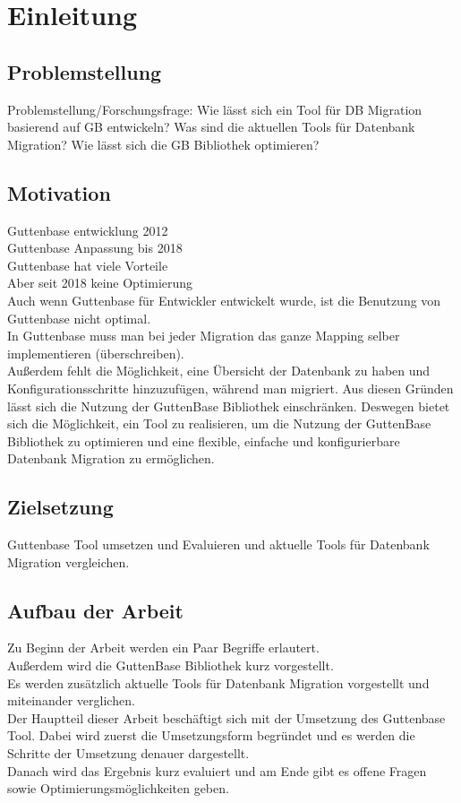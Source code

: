 \chapter{Einleitung}


\section{Problemstellung}

Problemstellung/Forschungsfrage: 
Wie lässt sich ein Tool für DB Migration basierend auf GB entwickeln?
Was sind die aktuellen Tools für Datenbank Migration?
Wie lässt sich die GB Bibliothek optimieren?


\section{Motivation}
Guttenbase entwicklung 2012 \\
Guttenbase Anpassung bis 2018\\
Guttenbase hat viele Vorteile\\
Aber seit 2018 keine Optimierung\\
Auch wenn Guttenbase für Entwickler entwickelt wurde, ist die Benutzung von Guttenbase nicht optimal.\\
In Guttenbase muss man bei jeder Migration das ganze Mapping selber implementieren (überschreiben). \\
Außerdem fehlt die Möglichkeit, eine Übersicht der Datenbank zu haben und Konfigurationsschritte hinzuzufügen, während man migriert.
Aus diesen Gründen lässt sich die Nutzung der GuttenBase Bibliothek einschränken. Deswegen bietet sich die Möglichkeit, ein Tool zu realisieren, um die Nutzung der GuttenBase Bibliothek zu optimieren und eine flexible, einfache und konfigurierbare Datenbank Migration zu ermöglichen.

\section{Zielsetzung}
Guttenbase Tool umsetzen und Evaluieren und aktuelle Tools für Datenbank Migration vergleichen.
\section{Aufbau der Arbeit}
Zu Beginn der Arbeit werden ein Paar Begriffe erlautert.\\
Außerdem wird die GuttenBase Bibliothek kurz vorgestellt.\\
Es werden zusätzlich aktuelle Tools für Datenbank Migration vorgestellt und miteinander verglichen.\\
Der Hauptteil dieser Arbeit beschäftigt sich mit der Umsetzung des Guttenbase Tool. Dabei wird zuerst die Umsetzungsform begründet und es werden die Schritte der Umsetzung denauer dargestellt.\\
Danach wird das Ergebnis kurz evaluiert und am Ende gibt es offene Fragen sowie Optimierungsmöglichkeiten geben.